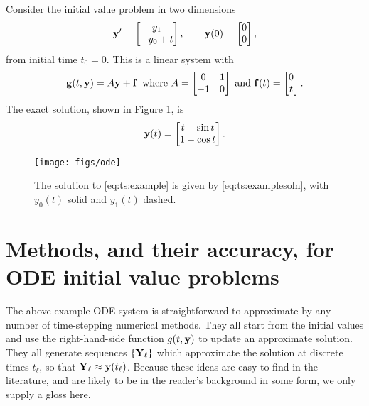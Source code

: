 \noindent\hrulefill
\begin{example}  \label{ex:ts:odeeasy} Consider the initial value problem in two dimensions
\begin{equation}
   \mathbf{y}' = \begin{bmatrix} y_1 \\ - y_0 + t\end{bmatrix}, \qquad \mathbf{y}(0) = \begin{bmatrix} 0 \\ 0 \end{bmatrix}, \label{eq:ts:example}
\end{equation}
from initial time $t_0=0$.  This is a linear system with
    $$\mathbf{g}(t,\mathbf{y}) = A \mathbf{y} + \mathbf{f} \,\text{ where } A = \begin{bmatrix} 0 & 1 \\ -1 & 0 \end{bmatrix} \text{ and } \mathbf{f}(t) = \begin{bmatrix} 0 \\ t\end{bmatrix}.$$
The exact solution, shown in Figure \ref{fig:ts:ode}, is
\begin{equation}
    \mathbf{y}(t) = \begin{bmatrix} t - \sin t \\ 1 - \cos t \end{bmatrix}.\label{eq:ts:examplesoln}
\end{equation}

\vspace{-3mm}
\begin{figure}
\texttt{[image: figs/ode]}
\caption{The solution to \eqref{eq:ts:example} is given by \eqref{eq:ts:examplesoln}, with $y_0(t)$ solid and $y_1(t)$ dashed.}
\label{fig:ts:ode}
\end{figure}
\end{example}
\vspace{-5mm}
\noindent\hrulefill

\section{Methods, and their accuracy, for ODE initial value problems}  The above example ODE system is straightforward to approximate by any number of time-stepping numerical methods.  They all start from the initial values and use the right-hand-side function $g(t,\mathbf{y})$ to update an approximate solution.  They all generate sequences $\{\mathbf{Y}_\ell\}$ which approximate the solution at discrete times $t_\ell$, so that $\mathbf{Y}_\ell \approx \mathbf{y}(t_\ell)$.  Because these ideas are easy to find in the literature, and are likely to be in the reader's background in some form, we only supply a gloss here.

